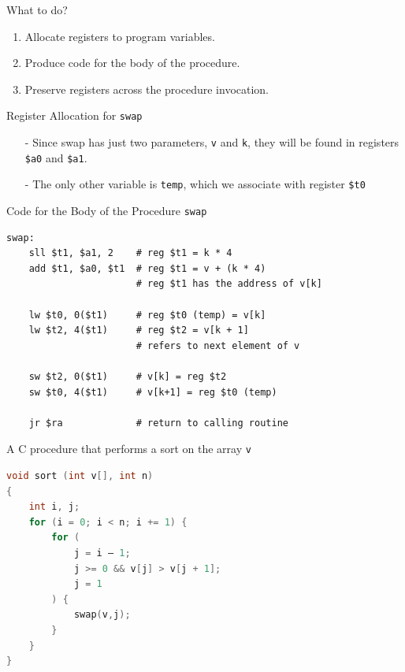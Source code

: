 \begin{frame}{What to do?}
\begin{enumerate}
\item
Allocate registers to program variables.

\item
Produce code for the body of the procedure.

\item
Preserve registers across the procedure invocation.
\end{enumerate}
\end{frame}

\begin{frame}{Register Allocation for \texttt{swap}}
\begin{itemize}
\item[-] Since swap has just two parameters, \texttt{v} and
\texttt{k}, they will be found in registers \texttt{\$a0} and \texttt{\$a1}. 

\item[-]The only other variable is \texttt{temp},
which we associate with register \texttt{\$t0}
\end{itemize}
\end{frame}

\begin{frame}[fragile]{Code for the Body of the Procedure \texttt{swap}}
\begin{lstlisting}[keywordstyle=\color{purple}\textbf, keywords={sll, add, lw, jr, sw}]
swap: 
    sll $t1, $a1, 2    # reg $t1 = k * 4
    add $t1, $a0, $t1  # reg $t1 = v + (k * 4)
                       # reg $t1 has the address of v[k]
    
    lw $t0, 0($t1)     # reg $t0 (temp) = v[k]
    lw $t2, 4($t1)     # reg $t2 = v[k + 1]
                       # refers to next element of v
    
    sw $t2, 0($t1)     # v[k] = reg $t2
    sw $t0, 4($t1)     # v[k+1] = reg $t0 (temp)
    
    jr $ra             # return to calling routine
\end{lstlisting}
\end{frame}

\begin{frame}[fragile]{A C procedure that performs a sort on the array \texttt{v}}
\begin{lstlisting}[language=c, keywordstyle=\color{purple}\textbf]
void sort (int v[], int n)
{
    int i, j;
    for (i = 0; i < n; i += 1) {
        for (
            j = i – 1;
            j >= 0 && v[j] > v[j + 1];
            j = 1
        ) {
            swap(v,j);
        }
    }
}
\end{lstlisting}
\end{frame}

